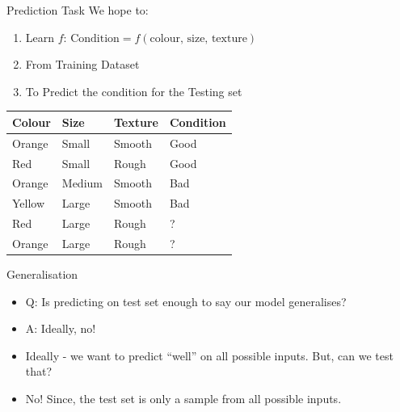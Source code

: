 \documentclass[usenames,dvipsnames]{beamer}
\begin{document}
\begin{frame}{Prediction Task}
We hope to:
\begin{enumerate}
	\item \pause Learn $f$: 		$\text{Condition} = f(\text{colour, size, texture})$
	\item \pause From Training Dataset
	\item \pause To Predict the condition for the Testing set
\end{enumerate}


\begin{table}[]
	\begin{tabular}{|l|l|l||l|}
		\hline 
		
		\textbf{Colour} & \textbf{Size} & \textbf{Texture} & \textbf{Condition} \\ \hline 
		Orange & Small & Smooth  & Good      \\
		Red    & Small  & Rough  & Good \\
		Orange & Medium & Smooth & Bad \\
		Yellow & Large  & Smooth & Bad \\ \hline
		Red    & Large  & Rough  & ? \\
		Orange &  Large & Rough  & ? \\ \hline          
	\end{tabular}
\end{table}
\end{frame}

\begin{frame}{Generalisation}
\begin{itemize}
	\item Q: Is predicting on test set enough to say our model generalises? 
	\item \pause A: Ideally, no!
	\item \pause Ideally - we want to predict ``well'' on all possible inputs. But, can we test that?
	\item \pause No! Since, the test set is only a sample from all possible inputs.
\end{itemize}





\end{frame}
\end{document}

